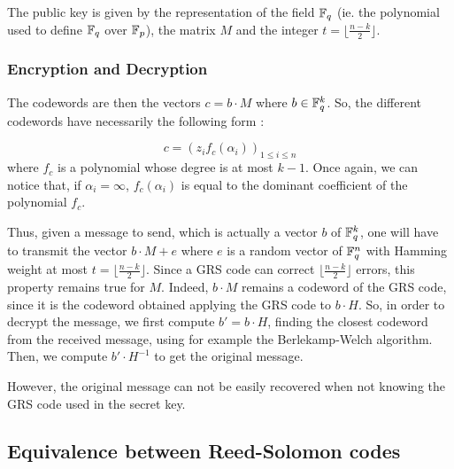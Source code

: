 \documentclass[a4paper]{article}
\begin{document}
The public key is given by the representation of the field $\mathbb{F}_q$ (ie. the polynomial used to define $\mathbb{F}_q$ over $\mathbb{F}_p$), the matrix $M$ and the integer $t=\lfloor\frac{n-k}{2}\rfloor$.

\subsubsection{Encryption and Decryption}
The codewords are then the vectors $c=b\cdot M$ where $b\in\mathbb{F}_q^k$. So, the different codewords have necessarily the following form :

$$c=(z_if_c(\alpha_i))_{1\leq i\leq n}$$ where $f_c$ is a polynomial whose degree is at most $k-1$.
Once again, we can notice that, if $\alpha_i = \infty$, $f_c(\alpha_i)$ is equal to the dominant coefficient of the polynomial $f_c$.

Thus, given a message to send, which is actually a vector $b$ of $\mathbb{F}_q^k$, one will have to transmit the vector $b\cdot M + e$ where $e$ is a random vector of $\mathbb{F}_q^n$ with Hamming weight at most $t=\lfloor\frac{n-k}{2}\rfloor$.
Since a GRS code can correct $\lfloor\frac{n-k}{2}\rfloor$ errors, this property remains true for $M$. Indeed, $b\cdot M$ remains a codeword of the GRS code, since it is the codeword obtained applying the GRS code to $b\cdot H$.
So, in order to decrypt the message, we first compute $b'=b\cdot H$, finding the closest codeword from the received message, using for example the Berlekamp-Welch algorithm.
Then, we compute $b'\cdot H^{-1}$ to get the original message.

However, the original message can not be easily recovered when not knowing the GRS code used in the secret key.

\subsection{Equivalence between Reed-Solomon codes}
\end{document}
